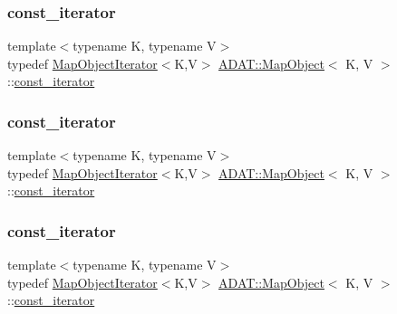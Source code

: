 \subsubsection{\texorpdfstring{const\_iterator}{const\_iterator}\hspace{0.1cm}{\footnotesize\ttfamily [1/3]}}
{\footnotesize\ttfamily template$<$typename K, typename V$>$ \\
typedef \mbox{\hyperlink{classADAT_1_1MapObjectIterator}{Map\+Object\+Iterator}}$<$K,V$>$ \mbox{\hyperlink{classADAT_1_1MapObject}{A\+D\+A\+T\+::\+Map\+Object}}$<$ K, V $>$\+::\mbox{\hyperlink{classADAT_1_1MapObject_a4622cd7d3b6fed18fe226d28091cc6c8}{const\+\_\+iterator}}}

\mbox{\label{classADAT_1_1MapObject_a4622cd7d3b6fed18fe226d28091cc6c8}} 
\subsubsection{\texorpdfstring{const\_iterator}{const\_iterator}\hspace{0.1cm}{\footnotesize\ttfamily [2/3]}}
{\footnotesize\ttfamily template$<$typename K, typename V$>$ \\
typedef \mbox{\hyperlink{classADAT_1_1MapObjectIterator}{Map\+Object\+Iterator}}$<$K,V$>$ \mbox{\hyperlink{classADAT_1_1MapObject}{A\+D\+A\+T\+::\+Map\+Object}}$<$ K, V $>$\+::\mbox{\hyperlink{classADAT_1_1MapObject_a4622cd7d3b6fed18fe226d28091cc6c8}{const\+\_\+iterator}}}

\mbox{\label{classADAT_1_1MapObject_a4622cd7d3b6fed18fe226d28091cc6c8}} 
\subsubsection{\texorpdfstring{const\_iterator}{const\_iterator}\hspace{0.1cm}{\footnotesize\ttfamily [3/3]}}
{\footnotesize\ttfamily template$<$typename K, typename V$>$ \\
typedef \mbox{\hyperlink{classADAT_1_1MapObjectIterator}{Map\+Object\+Iterator}}$<$K,V$>$ \mbox{\hyperlink{classADAT_1_1MapObject}{A\+D\+A\+T\+::\+Map\+Object}}$<$ K, V $>$\+::\mbox{\hyperlink{classADAT_1_1MapObject_a4622cd7d3b6fed18fe226d28091cc6c8}{const\+\_\+iterator}}}


